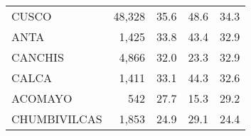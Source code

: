\begin{tabular}{lrrrr}
	\cellcolor[HTML]{FD6864}CUSCO                                           & 48,328                                                                & 35.6                                                                             & 48.6                                                                        & 34.3                                                                                \\
	\cellcolor[HTML]{FD6864}ANTA                                            & 1,425                                                                 & 33.8                                                                             & 43.4                                                                        & 32.9                                                                                \\
	\cellcolor[HTML]{FD6864}CANCHIS                                         & 4,866                                                                 & 32.0                                                                             & 23.3                                                                        & 32.9                                                                                \\
	\cellcolor[HTML]{FD6864}CALCA                                           & 1,411                                                                 & 33.1                                                                             & 44.3                                                                        & 32.6                                                                                \\
	\cellcolor[HTML]{FD6864}ACOMAYO                                         & 542                                                                   & 27.7                                                                             & 15.3                                                                        & 29.2                                                                                \\
	\cellcolor[HTML]{FD6864}CHUMBIVILCAS                                    & 1,853                                                                 & 24.9                                                                             & 29.1                                                                        & 24.4                                                                                \\

\end{tabular}
